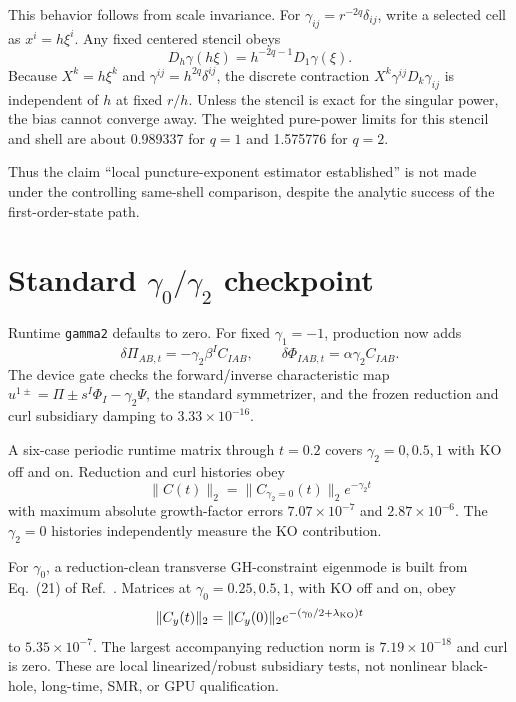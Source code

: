 \documentclass[11pt]{article}
\begin{document}
This behavior follows from scale invariance.  For
$\gamma_{ij}=r^{-2q}\delta_{ij}$, write a selected cell as $x^i=h\xi^i$.
Any fixed centered stencil obeys
\begin{equation}
 D_h\gamma(h\xi)=h^{-2q-1}D_1\gamma(\xi).
\end{equation}
Because $X^k=h\xi^k$ and
$\gamma^{ij}=h^{2q}\delta^{ij}$, the discrete contraction
$X^k\gamma^{ij}D_k\gamma_{ij}$ is independent of $h$ at fixed $r/h$.
Unless the stencil is exact for the singular power, the bias cannot converge
away.  The weighted pure-power limits for this stencil and shell are about
0.989337 for $q=1$ and 1.575776 for $q=2$.

Thus the claim ``local puncture-exponent estimator established'' is not made
under the controlling same-shell comparison, despite the analytic success of
the first-order-state path.

\section{Standard $\gamma_0/\gamma_2$ checkpoint}

Runtime \texttt{gamma2} defaults to zero. For fixed $\gamma_1=-1$, production
now adds
\begin{equation}
 \delta\Pi_{AB,t}=-\gamma_2\beta^I C_{IAB},\qquad
 \delta\Phi_{IAB,t}=\alpha\gamma_2 C_{IAB}.
\end{equation}
The device gate checks the forward/inverse characteristic map
$u^{1\pm}=\Pi\pm s^I\Phi_I-\gamma_2\Psi$, the standard symmetrizer, and the
frozen reduction and curl subsidiary damping to $3.33\times10^{-16}$.

A six-case periodic runtime matrix through $t=0.2$ covers
$\gamma_2=0,0.5,1$ with KO off and on.  Reduction and curl histories obey
\begin{equation}
 \|C(t)\|_2=\|C_{\gamma_2=0}(t)\|_2e^{-\gamma_2t}
\end{equation}
with maximum absolute growth-factor errors $7.07\times10^{-7}$ and
$2.87\times10^{-6}$.  The $\gamma_2=0$ histories independently measure the
KO contribution.

For $\gamma_0$, a reduction-clean transverse GH-constraint eigenmode is built
from Eq.~(21) of Ref.~\cite{lindblom2006}.  Matrices at
$\gamma_0=0.25,0.5,1$, with KO off and on, obey
\begin{equation}
 \|C_y(t)\|_2=\|C_y(0)\|_2
 e^{-(\gamma_0/2+\lambda_{\rm KO})t}
\end{equation}
to $5.35\times10^{-7}$.  The largest accompanying reduction norm is
$7.19\times10^{-18}$ and curl is zero.  These are local linearized/robust
subsidiary tests, not nonlinear black-hole, long-time, SMR, or GPU
qualification.
\end{document}
